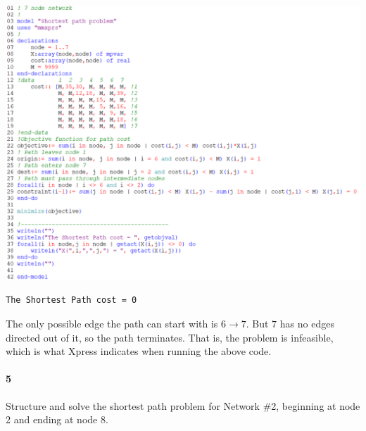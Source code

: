 \documentclass[12pt]{article}
\newenvironment{fullbox}{\begin{lrbox}{\savefullbox}\begin{minipage}{\dimexpr\textwidth-2\fboxsep\relax}}{\end{minipage}\end{lrbox}\begin{center}\framebox[\textwidth]{\usebox{\savefullbox}}\end{center}}
\newenvironment{pbox}[1][]{\begin{fullbox}\ifx#1\empty\else\paragraph{#1}\fi}{\end{fullbox}}
\theoremstyle{definition}
\begin{document}
\begin{center}
    \includegraphics[width=\textwidth]{code3.png}
\end{center}

\begin{verbatim}
The Shortest Path cost = 0
\end{verbatim}

The only possible edge the path can start with is $6 \to 7$. But $7$ has no edges directed out of it, so the path terminates. That is, the problem is infeasible, which is what Xpress indicates when running the above code.



\newpage
\begin{pbox}[5]
    Structure and solve the shortest path problem for Network \#2, beginning at node 2 and ending at node 8.
\end{pbox}
\end{document}
